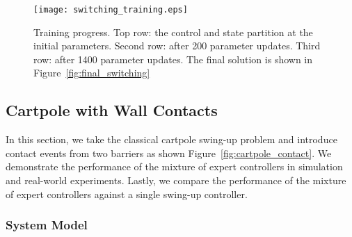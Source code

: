 \begin{figure}[H]
    \centering
    \texttt{[image: switching\_training.eps]}
    \caption{Training progress. Top row: the control and state partition at the
    initial parameters. Second row: after 200 parameter updates. Third row:
    after 1400 parameter updates. The final solution is shown in
    Figure~\ref{fig:final_switching}}
    \label{fig:switching_training}
\end{figure} 
\subsection{Cartpole with Wall Contacts}
\label{ssec:cartpole_with_walls}

In this section, we take the classical cartpole swing-up problem and introduce
contact events from two barriers as shown Figure~\ref{fig:cartpole_contact}. 
%
We demonstrate the performance of the mixture of expert controllers in
simulation and real-world experiments.
%
Lastly, we compare the performance of the mixture of expert controllers against
a single swing-up controller. 


\subsubsection{System Model}
\label{sssec:cartpole_model}


